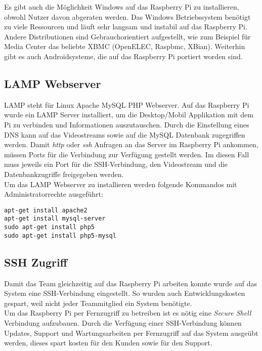Es gibt auch die Möglichkeit Windows auf das Raspberry Pi zu installieren, obwohl Nutzer davon abgeraten werden. Das Windows Betriebssystem benötigt zu viele Ressourcen und läuft sehr langsam und instabil auf das Raspberry Pi.\\

Andere Distributionen sind Gebrauchorientiert aufgestellt, wie zum Beispiel für Media Center das beliebte XBMC (OpenELEC, Raspbmc, XBian). Weiterhin gibt es auch Androidsysteme, die auf das Raspberry Pi portiert worden sind. \cite{bib.Raspian}



\subsection{LAMP Webserver}
LAMP steht für Linux Apache MySQL PHP Webserver. Auf das Raspberry Pi wurde ein LAMP Server installiert, um die Desktop/Mobil Applikation mit dem Pi zu verbinden und Informationen auszutauschen. Durch die Einstellung eines DNS kann auf das Videostreams sowie auf die MySQL Datenbank zugegriffen werden. Damit \textit{http} oder \textit{ssh} Anfragen  an das Server im Raspberry Pi ankommen, müssen Ports für die Verbindung zur Verfügung gestellt werden. Im diesen Fall muss jeweils ein Port für die SSH-Verbindung, den Videostream und die Datenbankzugriffe freigegeben werden.\\

Um das LAMP Webserver zu installieren werden folgende Kommandos mit Administratorrechte ausgeführt:\\
\begin{lstlisting}
apt-get install apache2
apt-get install mysql-server
sudo apt-get install php5
sudo apt-get install php5-mysql
\end{lstlisting}

\subsection{SSH Zugriff}
Damit das Team gleichzeitig auf das Raspberry Pi arbeiten konnte wurde auf das System eine SSH-Verbindung eingestellt. So wurden auch Entwicklungskosten gespart, weil nicht jeder Teammitglied ein System benötigte.\\

Um das Raspberry Pi per Fernzugriff zu betreiben ist es nötig eine \textit{Secure Shell} Verbindung aufzubauen. Durch die Verfügung einer SSH-Verbindung können Updates, Support und Wartungsarbeiten per Fernzugriff auf das System ausgeübt werden, dieses spart kosten für den Kunden sowie für den Support.

